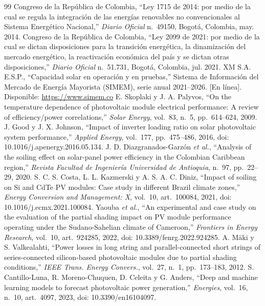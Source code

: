 \documentclass[conference]{IEEEtran}
\begin{document}
\begin{thebibliography}{99}
\scriptsize
{} Congreso de la Rep\'ublica de Colombia, ``Ley 1715 de 2014: por medio de la cual se regula la integraci\'on de las energ\'ias renovables no convencionales al Sistema Energ\'etico Nacional,'' \emph{Diario Oficial} n.\textordmasculine~49150, Bogot\'a, Colombia, may. 2014.
 Congreso de la Rep\'ublica de Colombia, ``Ley 2099 de 2021: por medio de la cual se dictan disposiciones para la transici\'on energ\'etica, la dinamizaci\'on del mercado energ\'etico, la reactivaci\'on econ\'omica del pa\'is y se dictan otras disposiciones,'' \emph{Diario Oficial} n.\textordmasculine~51.731, Bogot\'a, Colombia, jul. 2021.
 XM S.A. E.S.P., ``Capacidad solar en operaci\'on y en pruebas,'' Sistema de Informaci\'on del Mercado de Energ\'ia Mayorista (SIMEM), serie anual 2021--2026. [En l\'inea]. Disponible: \url{https://www.simem.co}
 E. Skoplaki y J. A. Palyvos, ``On the temperature dependence of photovoltaic module electrical performance: A review of efficiency/power correlations,'' \emph{Solar Energy}, vol.~83, n.\textordmasculine~5, pp.~614--624, 2009.
 J. Good y J. X. Johnson, ``Impact of inverter loading ratio on solar photovoltaic system performance,'' \emph{Applied Energy}, vol.~177, pp.~475--486, 2016, doi: 10.1016/j.apenergy.2016.05.134.
 J. D. Diazgranados-Garz\'on \emph{et al.}, ``Analysis of the soiling effect on solar-panel power efficiency in the Colombian Caribbean region,'' \emph{Revista Facultad de Ingenier\'ia Universidad de Antioquia}, n.\textordmasculine~97, pp.~22--29, 2020.
 S. C. S. Costa, L. L. Kazmerski y A. S. A. C. Diniz, ``Impact of soiling on Si and CdTe PV modules: Case study in different Brazil climate zones,'' \emph{Energy Conversion and Management: X}, vol.~10, art.~100084, 2021, doi: 10.1016/j.ecmx.2021.100084.
 Yaouba \emph{et al.}, ``An experimental and case study on the evaluation of the partial shading impact on PV module performance operating under the Sudano-Sahelian climate of Cameroon,'' \emph{Frontiers in Energy Research}, vol.~10, art.~924285, 2022, doi: 10.3389/fenrg.2022.924285.
 A. M\"aki y S. Valkealahti, ``Power losses in long string and parallel-connected short strings of series-connected silicon-based photovoltaic modules due to partial shading conditions,'' \emph{IEEE Trans. Energy Convers.}, vol.~27, n.\textordmasculine~1, pp.~173--183, 2012.
 S. Cantillo-Luna, R. Moreno-Chuquen, D. Celeita y G. Anders, ``Deep and machine learning models to forecast photovoltaic power generation,'' \emph{Energies}, vol.~16, n.\textordmasculine~10, art.~4097, 2023, doi: 10.3390/en16104097.

\end{thebibliography}
\end{document}

